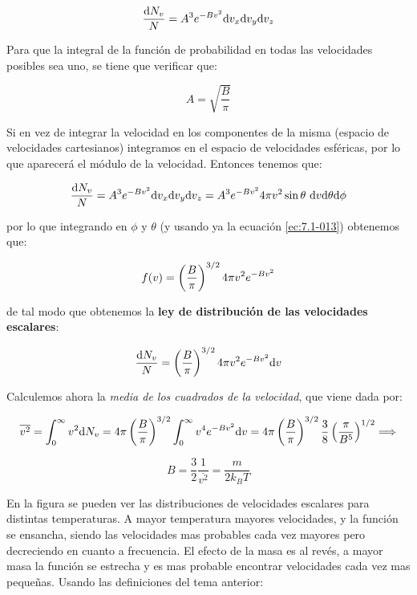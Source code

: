 \documentclass[12pt]{book}
\begin{document}
\begin{equation}
\dfrac{\mathrm{d} N_{v}}{N} = A^3 e^{-Bv^2} \mathrm{d} v_x \mathrm{d} v_y \mathrm{d} v_z
\end{equation}

Para que la integral de la función de probabilidad en todas las velocidades posibles sea uno, se tiene que verificar que:

\begin{equation}
A = \sqrt{\dfrac{B}{\pi}} \label{ec:7.1-013}
\end{equation}

Si en vez de integrar la velocidad en los componentes de la misma (espacio de velocidades cartesianos) integramos en el espacio de velocidades esféricas, por lo que aparecerá el módulo de la velocidad. Entonces tenemos que:

\begin{equation}
\dfrac{\mathrm{d} N_{v}}{N} = A^3 e^{-Bv^2} \mathrm{d} v_x \mathrm{d} v_y \mathrm{d} v_z = A^3 e^{-Bv^2} 4 \pi v^2 \sin \theta \ \mathrm{d} v \mathrm{d} \theta \mathrm{d} \phi 
\end{equation}

por lo que integrando en $\phi$ y $\theta$ (y usando ya la ecuación \ref{ec:7.1-013}) obtenemos que:

\begin{equation}
f(v) = \left( \dfrac{B}{\pi} \right)^{3/2} 4 \pi v^2 e^{-B v^2}
\end{equation}


de tal modo que obtenemos la \textbf{ley de distribución de las velocidades escalares}:

\begin{equation}
\dfrac{\mathrm{d} N_v}{N} = \left( \dfrac{B}{\pi} \right)^{3/2} 4 \pi v^2 e^{-Bv^2} \mathrm{d} v \label{ec:7.1-016}
\end{equation}

Calculemos ahora la \textit{media de los cuadrados de la velocidad}, que viene dada por: 

$$ \overline{v^2} = \int_{0}^{\infty} v^2 \mathrm{d} N_v  = 4 \pi \left( \dfrac{B}{\pi} \right)^{3/2} \int_{0}^{\infty} v^4 e^{-Bv^2} \mathrm{d} v = 4 \pi \left( \dfrac{B}{\pi} \right)^{3/2} \dfrac{3}{8} \left( \dfrac{\pi}{B^5} \right)^{1/2} \Longrightarrow $$

\begin{equation}
B = \dfrac{3}{2} \dfrac{1}{\overline{v^2}} = \dfrac{m}{2 k_B T}
\end{equation}

En la figura se pueden ver las distribuciones de velocidades escalares para distintas temperaturas. A mayor temperatura mayores velocidades, y la función se ensancha, siendo las velocidades mas probables cada vez mayores pero decreciendo en cuanto a frecuencia. El efecto de la masa es al revés, a mayor masa la función se estrecha y es mas probable encontrar velocidades cada vez mas pequeñas. Usando las definiciones del tema anterior:
\end{document}
